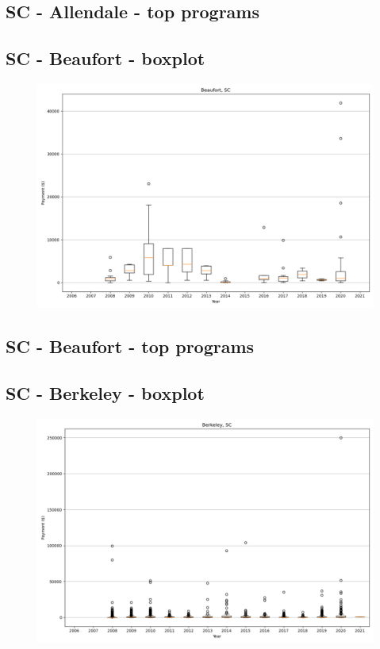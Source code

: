 \subsection*{SC - Allendale - top programs}

\newpage
\subsection*{SC - Beaufort - boxplot}
\begin{figure}[h]
\centering
\includegraphics[width=7in]{../output/boxplots/counties/Beaufort-SC_boxplot.png}
\end{figure}


\subsection*{SC - Beaufort - top programs}

\newpage
\subsection*{SC - Berkeley - boxplot}
\begin{figure}[h]
\centering
\includegraphics[width=7in]{../output/boxplots/counties/Berkeley-SC_boxplot.png}
\end{figure}


